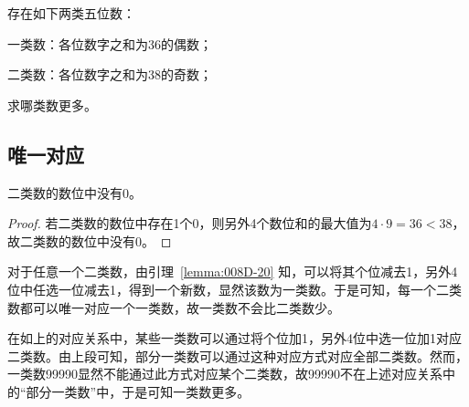 

存在如下两类五位数：

一类数：各位数字之和为36的偶数；

二类数：各位数字之和为38的奇数；

求哪类数更多。


\subsection{唯一对应}

\begin{lemma} \label{lemma:008D-20}
  二类数的数位中没有0。
\end{lemma}

\begin{proof}
  若二类数的数位中存在1个0，则另外4个数位和的最大值为$4\cdot9 = 36 < 38$，故二类数的数位中没有0。
\end{proof}

对于任意一个二类数，由引理~\ref{lemma:008D-20} 知，可以将其个位减去1，另外4位中任选一位减去1，得到一个新数，显然该数为一类数。于是可知，每一个二类数都可以唯一对应一个一类数，故一类数不会比二类数少。

在如上的对应关系中，某些一类数可以通过将个位加1，另外4位中选一位加1对应二类数。由上段可知，部分一类数可以通过这种对应方式对应全部二类数。然而，一类数99990显然不能通过此方式对应某个二类数，故99990不在上述对应关系中的“部分一类数”中，于是可知一类数更多。
